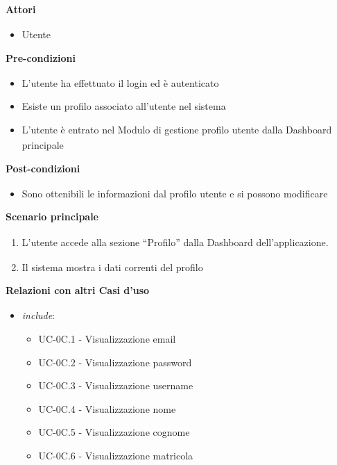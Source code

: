 ﻿\documentclass[a4paper,11pt]{article}
\begin{document}
\textbf{Attori\textsubscript{}}
\begin{itemize}
    \item Utente 
\end{itemize}


\textbf{Pre-condizioni\textsubscript{}}
\begin{itemize}
    \item L'utente ha effettuato il login ed è autenticato
    \item Esiste un profilo associato all'utente nel sistema
    \item L'utente è entrato nel Modulo\textsubscript{} di gestione profilo utente dalla Dashboard\textsubscript{} principale

\end{itemize}
\newpage

\textbf{Post-condizioni\textsubscript{}}
\begin{itemize}
    \item Sono ottenibili le informazioni dal profilo utente e si possono modificare
\end{itemize}

\textbf{Scenario principale\textsubscript{}}
\begin{enumerate}
    \item L'utente accede alla sezione “Profilo” dalla Dashboard\textsubscript{} dell'applicazione.
    \item Il sistema mostra i dati correnti del profilo
\end{enumerate}


\textbf{Relazioni con altri Casi d'uso\textsubscript{}}
\begin{itemize}
    \item \textit{include}: 
    \begin{itemize}
        \item UC-0C.1 - Visualizzazione email
        \item UC-0C.2 - Visualizzazione password
        \item UC-0C.3 - Visualizzazione username
        \item UC-0C.4 - Visualizzazione nome 
        \item UC-0C.5 - Visualizzazione cognome
        \item UC-0C.6 - Visualizzazione matricola
    \end{itemize}
\end{itemize}
\end{document}
